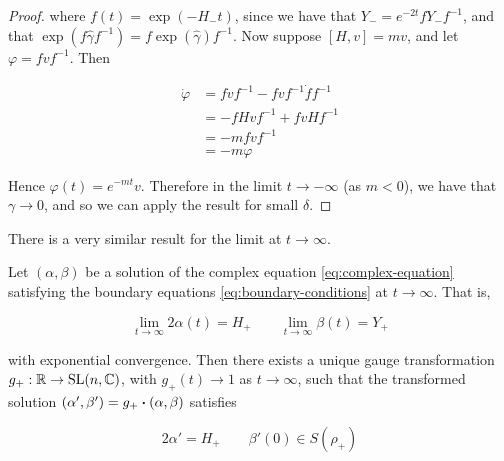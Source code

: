 \documentclass{report}
\begin{document}
\begin{proof}
    where \(f(t) = \exp(-H_-t)\), since we have that \(Y_- = e^{-2t}fY_-f^{-1}\), and that \(\exp(f\hat\gamma f^{-1}) = f\exp(\hat\gamma)f^{-1}\). Now suppose \([H, v] = mv\), and let \(\varphi = fvf^{-1}\). Then

    \begin{align*}
        \dot\varphi &= f\dot vf^{-1} - fvf^{-1}\dot f f^{-1} \\
        &= -fHvf^{-1} + fvHf^{-1} \\
        &= -mfvf^{-1} \\
        &= -m\varphi
    \end{align*}

    Hence \(\varphi(t) = e^{-mt}v\). Therefore in the limit \(t \to -\infty\) (as \(m < 0\)), we have that \(\gamma \to 0\), and so we can apply the result for small \(\delta\).
\end{proof}

There is a very similar result for the limit at \(t \to \infty\).

\begin{lemma}
    \label{lem:complex-trajectory-convergence-positive}

    Let \((\alpha, \beta)\) be a solution of the complex equation \cref{eq:complex-equation} satisfying the boundary equations \cref{eq:boundary-conditions} at \(t \to \infty\). That is,

    \[\lim_{t \to \infty}2\alpha(t) = H_+ \qquad \lim_{t \to \infty}\beta(t) = Y_+\]

    with exponential convergence. Then there exists a unique gauge transformation \(g_+ : \mathbb{R} \to \operatorname{SL}(n, \mathbb{C})\), with \(g_+(t) \to 1\) as \(t \to \infty\), such that the transformed solution \((\alpha', \beta') = g_+ \vdot (\alpha, \beta)\) satisfies

    \[2\alpha' = H_+ \qquad \beta'(0) \in S(\rho_+)\]
\end{lemma}
\end{document}

